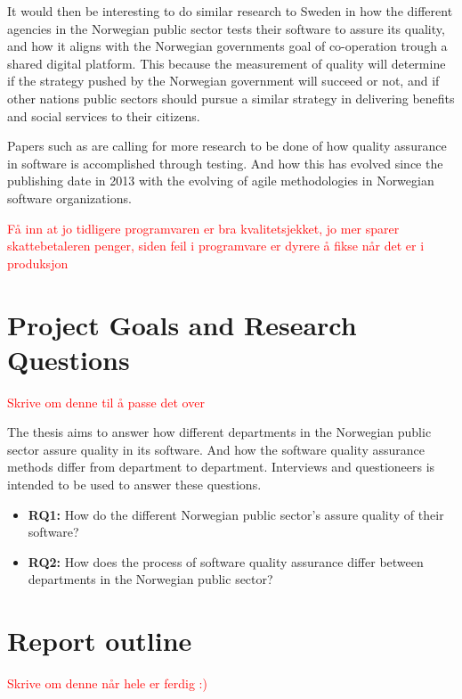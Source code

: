 It would then be interesting to do similar research to Sweden in how the different agencies in the Norwegian public sector tests their software to assure its quality, and how it aligns with the Norwegian governments goal of co-operation trough a shared digital platform. This because the measurement of quality will determine if the strategy pushed by the Norwegian government will succeed or not, and if other nations public sectors should pursue a similar strategy in delivering benefits and social services to their citizens.

Papers such as \cite{ad_2013} are calling for more research to be done of how quality assurance in software is accomplished through testing. And how this has evolved since the publishing date in 2013 with the evolving of agile methodologies in Norwegian software organizations.

\textcolor{red}{Få inn at jo tidligere programvaren er bra kvalitetsjekket, jo mer sparer skattebetaleren penger, siden feil i programvare er dyrere å fikse når det er i produksjon}

\section{Project Goals and Research Questions}
\textcolor{red}{Skrive om denne til å passe det over}

The thesis aims to answer how different departments in the Norwegian public sector assure quality in its software. And how the software quality assurance methods differ from department to department. Interviews and questioneers is intended to be used to answer these questions. 

\begin{itemize}
    \item \textbf{RQ1:} How do the different Norwegian public sector's assure quality of their software?
    \item \textbf{RQ2:} How does the process of software quality assurance differ between departments in the Norwegian public sector?
\end{itemize}

\section{Report outline}

\textcolor{red}{Skrive om denne når hele er ferdig :)}